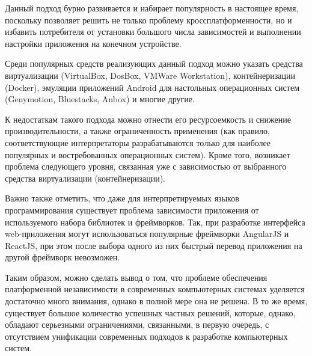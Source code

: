 \begin{itemize}
	Данный подход бурно развивается и набирает популярность в настоящее время, поскольку позволяет решить не только проблему кроссплатформенности, но и избавить потребителя от установки большого числа зависимостей и выполнении настройки приложения на конечном устройстве.
	
	Среди популярных средств реализующих данный подход можно указать средства виртуализации (VirtualBox, DosBox, VMWare Workstation), контейнеризации (Docker), эмуляции приложений Android для настольных операционных систем (Genymotion, Bluestacks, Anbox) и многие другие.
	
	К недостаткам такого подхода можно отнести его ресурсоемкость и снижение производительности, а также ограниченность применения (как правило, соответствующие интерпретаторы разрабатываются только для наиболее популярных и востребованных операционных систем). Кроме того, возникает проблема следующего уровня, связанная уже с зависимостью от выбранного средства виртуализации (контейнеризации).
\end{itemize}

Важно также отметить, что даже для интерпретируемых языков программирования существует проблема зависимости приложения от используемого набора библиотек и фреймворков. Так, при разработке интерфейса web-приложения могут использоваться популярные фреймворки AngularJS и ReactJS, при этом после выбора одного из них быстрый перевод приложения на другой фреймворк невозможен.

Таким образом, можно сделать вывод о том, что проблеме обеспечения платформенной независимости в современных компьютерных системах уделяется достаточно много внимания, однако в полной мере она не решена. В то же время, существует большое количество успешных частных решений, которые, однако, обладают серьезными ограничениями, связанными, в первую очередь, с отсутствием унификации современных подходов к разработке компьютерных систем. 

